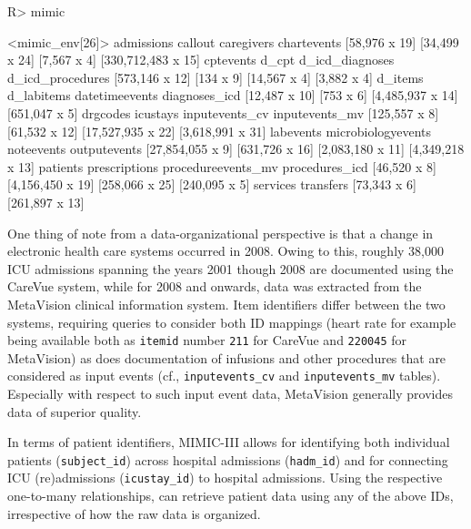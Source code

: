 \documentclass[
  notitle,
  nojss,
  noheadings]{jss}
\begin{document}
\begin{CodeChunk}
\begin{CodeInput}
R> mimic
\end{CodeInput}
\begin{CodeOutput}
<mimic_env[26]>
        admissions            callout         caregivers        chartevents 
     [58,976 x 19]      [34,499 x 24]        [7,567 x 4] [330,712,483 x 15] 
         cptevents              d_cpt    d_icd_diagnoses   d_icd_procedures 
    [573,146 x 12]          [134 x 9]       [14,567 x 4]        [3,882 x 4] 
           d_items         d_labitems     datetimeevents      diagnoses_icd 
     [12,487 x 10]          [753 x 6]   [4,485,937 x 14]      [651,047 x 5] 
          drgcodes           icustays     inputevents_cv     inputevents_mv 
     [125,557 x 8]      [61,532 x 12]  [17,527,935 x 22]   [3,618,991 x 31] 
         labevents microbiologyevents         noteevents       outputevents 
  [27,854,055 x 9]     [631,726 x 16]   [2,083,180 x 11]   [4,349,218 x 13] 
          patients      prescriptions procedureevents_mv     procedures_icd 
      [46,520 x 8]   [4,156,450 x 19]     [258,066 x 25]      [240,095 x 5] 
          services          transfers 
      [73,343 x 6]     [261,897 x 13] 
\end{CodeOutput}
\end{CodeChunk}

One thing of note from a data-organizational perspective is that a
change in electronic health care systems occurred in 2008. Owing to
this, roughly 38,000 ICU admissions spanning the years 2001 though 2008
are documented using the CareVue system, while for 2008 and onwards,
data was extracted from the MetaVision clinical information system. Item
identifiers differ between the two systems, requiring queries to
consider both ID mappings (heart rate for example being available both
as \texttt{itemid} number \texttt{211} for CareVue and \texttt{220045}
for MetaVision) as does documentation of infusions and other procedures
that are considered as input events (cf., \texttt{inputevents\_cv} and
\texttt{inputevents\_mv} tables). Especially with respect to such input
event data, MetaVision generally provides data of superior quality.

In terms of patient identifiers, MIMIC-III allows for identifying both
individual patients (\texttt{subject\_id}) across hospital admissions
(\texttt{hadm\_id}) and for connecting ICU (re)admissions
(\texttt{icustay\_id}) to hospital admissions. Using the respective
one-to-many relationships,  can retrieve patient data using
any of the above IDs, irrespective of how the raw data is organized.
\end{document}
